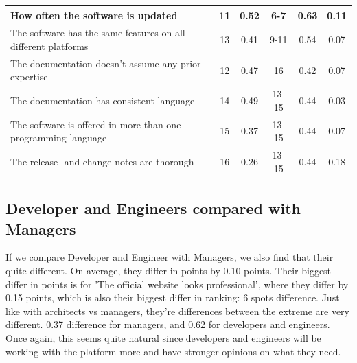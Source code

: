 \documentclass{cslthse-msc}
\begin{document}
\begin{table}[H]
\begin{tabularx}{\columnwidth}{X|c:c|c:c|c}
            How often the software is updated                                     &        11 & 0.52       &          6-7 & 0.63           & 0.11  \\ \hline
            The software has the same features on all different platforms         &        13 & 0.41       &         9-11 & 0.54           & 0.07  \\ \hline
            The documentation doesn't assume any prior expertise                  &        12 & 0.47       &           16 & 0.42           & 0.07  \\ \hline
            The documentation has consistent language                             &        14 & 0.49       &        13-15 & 0.44           & 0.03  \\ \hline
            The software is offered in more than one programming language         &        15 & 0.37       &        13-15 & 0.44           & 0.07  \\ \hline
            The release- and change notes are thorough                            &        16 & 0.26       &        13-15 & 0.44           & 0.18  \\ \hline
        \end{tabularx}
    \end{table}

    \subsection{Developer and Engineers compared with Managers}
    If we compare Developer and Engineer with Managers, we also find that
    their quite different. On average, they differ in points by 0.10
    points. Their biggest differ in points is for 'The official website
    looks professional', where they differ by 0.15 points, which is also
    their biggest differ in ranking: 6 spots difference. Just like with architects vs managers, they're differences between the extreme are very different. 0.37 difference for managers, and 0.62 for developers and engineers. Once again, this seems quite natural since developers and engineers will be working with the platform more and have stronger opinions on what they need.
\end{document}
